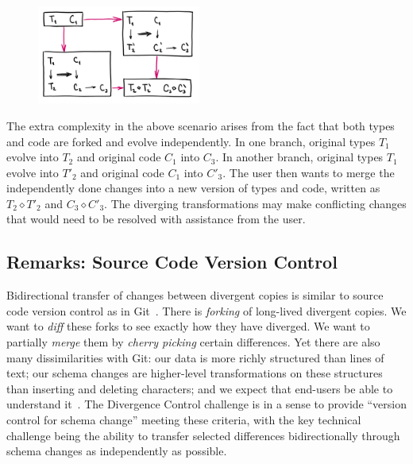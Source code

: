 \documentclass[english,submission]{programming}
\DeclareRobustCommand{\frameworkbox}[1]{\leftbar#1\endleftbar}
\newcommand{\frameworkboxtitle}[1]{\noindent{\firamedium #1.}\quad}
\begin{document}
\frameworkbox{
\begin{figure}
\vspace{-0.5em}
\includegraphics[width=14.5em]{figures/arr-divergence.png}
\vspace{-1.5em}
\end{figure}
\frameworkboxtitle{Maintaining Divergent Variants}
The extra complexity in the above scenario arises from the fact that both types and
code are forked and evolve independently. In one branch, original types $T_1$ evolve
into $T_2$ and original code $C_1$ into $C_3$. In another branch, original types $T_1$
evolve into $T'_2$ and original code $C_1$ into $C'_3$. The user then wants to merge
the independently done changes into a new version of types and code, written as
$T_2 \diamond T'_2$ and $C_3 \diamond C'_3$. The diverging transformations may make
conflicting changes that would need to be resolved with assistance from the user.}


\subsection*{Remarks: Source Code Version Control}

Bidirectional transfer of changes between divergent copies is similar to source code version
control as in Git~\cite{ProGit}. There is \textit{forking} of long-lived divergent copies.
We want to \textit{diff} these forks to see exactly how they have diverged. We want to
partially \textit{merge} them by \textit{cherry picking} certain differences. Yet there are
also many dissimilarities with Git: our data is more richly structured than lines of text; our
schema changes are higher-level transformations on these structures than inserting and
deleting characters; and we expect that end-users be able to understand it~\cite{gitless}.
The Divergence Control challenge is in a sense to provide ``version control for schema
change'' meeting these criteria, with the key technical challenge being the ability to
transfer selected differences bidirectionally through schema changes as independently as possible.
\end{document}
